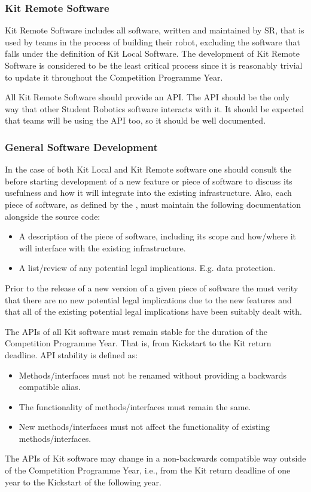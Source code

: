 \begin{draft}
\subsubsection{Kit Remote Software}
Kit Remote Software includes all software, written and maintained by SR, that is used by teams in the process of building their robot, excluding the software that falls under the definition of Kit Local Software. The development of Kit Remote Software is considered to be the least critical process since it is reasonably trivial to update it throughout the Competition Programme Year.

All Kit Remote Software should provide an API. The API should be the only way that other Student Robotics software interacts with it. It should be expected that teams will be using the API too, so it should be well documented.

\subsubsection{General Software Development}
In the case of both Kit Local and Kit Remote software one should consult the  before starting development of a new feature or piece of software to discuss its usefulness and how it will integrate into the existing infrastructure. Also, each piece of software, as defined by the , must maintain the following documentation alongside the source code:
\begin{itemize}
  \item A description of the piece of software, including its scope and how/where it will interface with the existing infrastructure.
  \item A list/review of any potential legal implications. E.g. data protection.
\end{itemize}
Prior to the release of a new version of a given piece of software the  must verity that there are no new potential legal implications due to the new features and that all of the existing potential legal implications have been suitably dealt with.

The APIs of all Kit software must remain stable for the duration of the Competition Programme Year. That is, from Kickstart to the Kit return deadline. API stability is defined as:
\begin{itemize}
  \item Methods/interfaces must not be renamed without providing a backwards compatible alias.
  \item The functionality of methods/interfaces must remain the same.
  \item New methods/interfaces must not affect the functionality of existing methods/interfaces.
\end{itemize}
The APIs of Kit software may change in a non-backwards compatible way outside of the Competition Programme Year, i.e., from the Kit return deadline of one year to the Kickstart of the following year.

\end{draft}
